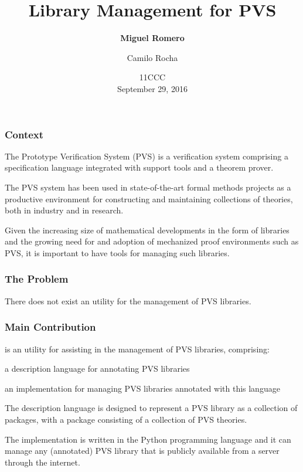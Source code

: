 \documentclass[mathserif,fleqn]{beamer}
\title{ 
  Library Management for PVS
}
\author[M. Romero]{
  {\bf Miguel Romero\Mark{1}} \and Camilo Rocha\Mark{2}
}
\institute[ECI]{
  \large \Mark{1}Escuela Colombiana de Ingenier\'ia Julio Garavito, Bogotá\\ \Mark{2}Pontificia Universidad Javeriana, Cali 
}
\date[MPL 09.27.2016]{
  11CCC\\
  September 29, 2016
}
\begin{document}
\begin{frame}
  \titlepage
\end{frame}

\begin{frame}
  \frametitle{Context}
 
   \begin{outeritemize}
   \item The Prototype Verification System (PVS) is a verification
     system comprising a specification language integrated with
     support tools and a theorem prover.
     
   \item The PVS system has been used in state-of-the-art formal
     methods projects as a productive environment for constructing and
     maintaining collections of theories, both in industry and in
     research.
     
   \item Given the increasing size of mathematical developments in the
     form of libraries and the growing need for and adoption of
     mechanized proof environments such as PVS, it is important to
     have tools for managing such libraries.
   \end{outeritemize}
\end{frame}

\begin{frame}
  \frametitle{The Problem} There does not exist an utility for the
  management of PVS libraries.
\end{frame}

\begin{frame}
  \frametitle{Main Contribution}
   \begin{outeritemize}
   \item {} is an utility for assisting in the management of
     PVS libraries, comprising:
   \begin{inneritemize}
      \item a description language for annotating PVS libraries
      \item an implementation for managing PVS libraries annotated with this language
   \end{inneritemize}
 \item The description language is designed to represent a PVS library
   as a collection of packages, with a package consisting of a
   collection of PVS theories.

 \item The implementation is written in the Python programming
   language and it can manage any (annotated) PVS library that is
   publicly available from a  server through the internet.
   \end{outeritemize}
\end{frame}
\end{document}
